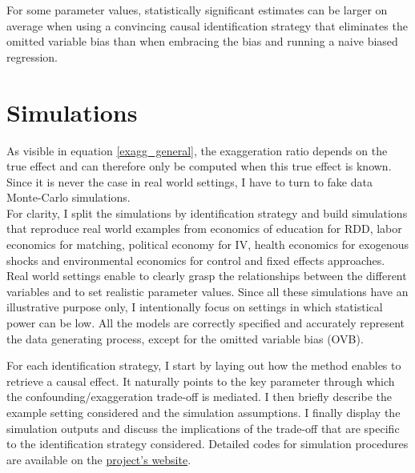 \documentclass[usletter, 12pt]{article}
\begin{document}
			For some parameter values, statistically significant estimates can be larger on average when using a convincing causal identification strategy that eliminates the omitted variable bias than when embracing the bias and running a naive biased regression.	
	


				
	\section{Simulations} \label{simulations}
		
		 As visible in equation \ref{exagg_general},  the exaggeration ratio depends on the true effect and can therefore only be computed when this true effect is known. Since it is never the case in real world settings, I have to turn to fake data Monte-Carlo simulations.\\
    
    For clarity, I split the simulations by identification strategy %
    and build simulations that reproduce real world examples from economics of education for RDD, labor economics for matching, political economy for IV, health economics for exogenous shocks and environmental economics for control and fixed effects approaches. Real world settings enable to clearly grasp the relationships between the different variables and to set realistic parameter values. Since all these simulations have an illustrative purpose only, I intentionally focus on settings in which statistical power can be low. All the models are correctly specified and accurately represent the data generating process, except for the omitted variable bias (OVB).
    
     		For each identification strategy, I start by laying out how the method enables to retrieve a causal effect. It naturally points to the key parameter through which the confounding/exaggeration trade-off is mediated. I then briefly describe the example setting considered and the simulation assumptions. I finally display the simulation outputs and discuss the implications of the trade-off that are specific to the identification strategy considered. Detailed codes for simulation procedures are available on the \href{https://vincentbagilet.github.io/causal_inflation/}{project's website}.
		
\end{document}
